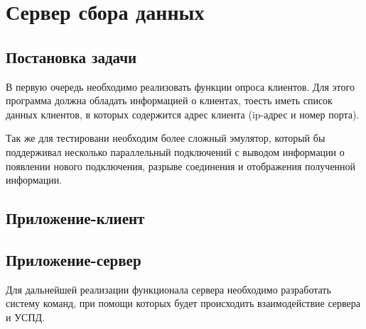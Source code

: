 \section{Сервер сбора данных}
\subsection{Постановка задачи}

В первую очередь необходимо реализовать функции опроса клиентов. Для этого программа должна обладать информацией о клиентах, тоесть иметь список данных клиентов, в которых содержится адрес клиента (ip-адрес и номер порта).

Так же для тестировани необходим более сложный эмулятор, который бы поддерживал несколько параллельный подключений с выводом информации о появлении нового подключения, разрыве соединения и отображения полученной информации.

\subsection{Приложение-клиент}



\subsection{Приложение-сервер}



Для дальнейшей реализации функционала сервера необходимо разработать систему команд, при помощи которых будет происходить взаимодействие сервера и УСПД.